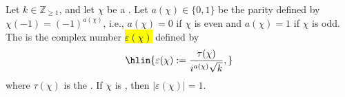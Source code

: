 \begin{definition} \label{definition:root_number_of_a_dirichlet_character}
Let $k \in \mathbb{Z}_{\geq 1}$, and let $\chi$ be a . Let $a(\chi) \in \{0,1\}$ be the parity defined by $\chi(-1) = (-1)^{a(\chi)}$, i.e., $a(\chi) = 0$ if $\chi$ is even and $a(\chi) = 1$ if $\chi$ is odd. The  is the complex number \hl{$\varepsilon(\chi)$} defined by
$$\hlin{\varepsilon(\chi) := \frac{\tau(\chi)}{i^{a(\chi)} \sqrt{k}},}$$
where $\tau(\chi)$ is the . If $\chi$ is , then $|\varepsilon(\chi)| = 1$.
\end{definition}
